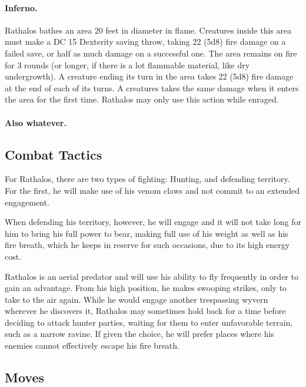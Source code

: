 \begin{hbMonsterNoteWide}[b]
\begin{multicols}{2}
\begin{hbStatBlock}
\paragraph*{Inferno.} Rathalos bathes an area 20 feet in diameter in flame. Creatures inside this area must make a DC 15 Dexterity saving throw, taking 22 (5d8) fire damage on a failed save, or half as much damage on a successful one. The area remains on fire for 3 rounds (or longer, if there is a lot flammable material, like dry undergrowth). A creature ending its turn in the area takes 22 (5d8) fire damage at the end of each of its turns. A creatures takes the same damage when it enters the area for the first time. Rathalos may only use this action while enraged.

\end{hbStatBlock}
\end{multicols}
\end{hbMonsterNoteWide}

\paragraph*{Also whatever.} \lipsum[8]

\pagebreak

\subsection{Combat Tactics}
For Rathalos, there are two types of fighting: Hunting, and defending territory. For the first, he will make use of his venom claws and not commit to an extended engagement.

When defending his territory, however, he will engage and it will not take long for him to bring his full power to bear, making full use of his weight as well as his fire breath, which he keeps in reserve for such occasions, due to its high energy cost.

Rathalos is an aerial predator and will use his ability to fly frequently in order to gain an advantage. From his high position, he makes swooping strikes, only to take to the air again. While he would engage another trespassing wyvern wherever he discovers it, Rathalos may sometimes hold back for a time before deciding to attack hunter parties, waiting for them to enter unfavorable terrain, such as a narrow ravine. If given the choice, he will prefer places where his enemies cannot effectively escape his fire breath.

\subsection*{Moves}

